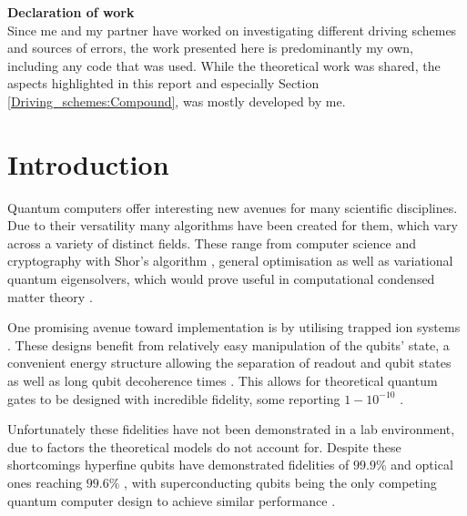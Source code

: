 \documentclass[12pt,twoside]{report}
\begin{document}
\vspace*{\fill}
\begin{center}
	\textbf{Declaration of work}\\
	Since me and my partner have worked on investigating different driving schemes and sources of errors, the work presented here is predominantly my own, including any code that was used. While the theoretical work was shared, the aspects highlighted in this report and especially Section \ref{Driving_schemes:Compound}, was mostly developed by me.
\end{center}
\vspace*{\fill}
\newpage

\tableofcontents

\clearpage{\pagestyle{empty}\cleardoublepage}
\setcounter{page}{1}
\fancyhead[LE,RO]{\slshape \rightmark}
\fancyhead[LO,RE]{\slshape \leftmark}

\chapter{Introduction}
\label{Intro}

Quantum computers offer interesting new avenues for many scientific disciplines. Due to their versatility many algorithms have been created for them, which vary across a variety of distinct fields. These range from computer science and cryptography with Shor's algorithm \cite{Shor}, general optimisation \cite{Quantum_optimiser} as well as variational quantum eigensolvers, which would prove useful in computational condensed matter theory \cite{VQE_CMTH}.

One promising avenue toward implementation is by utilising trapped ion systems \cite{Trapped_ion_rev,Trapped_ion_qbit_toolbox,Trapped_Quantum_Computer}. These designs benefit from relatively easy manipulation of the qubits' state, a convenient energy structure allowing the separation of readout and qubit states as well as long qubit decoherence times \cite{QIP_Trapped_ions}. This allows for theoretical quantum gates to be designed with incredible fidelity, some reporting $1-10^{-10}$ \cite{SC_Paper}.

Unfortunately these fidelities have not been demonstrated in a lab environment, due to factors the theoretical models do not account for. Despite these shortcomings hyperfine qubits have demonstrated fidelities of $99.9\%$ \cite{Hyperfine_qubit} and optical ones reaching $99.6\%$ \cite{Optical_qubit}, with superconducting qubits being the only competing quantum computer design to achieve similar performance \cite{Trapped_ion_rev}.
\end{document}
